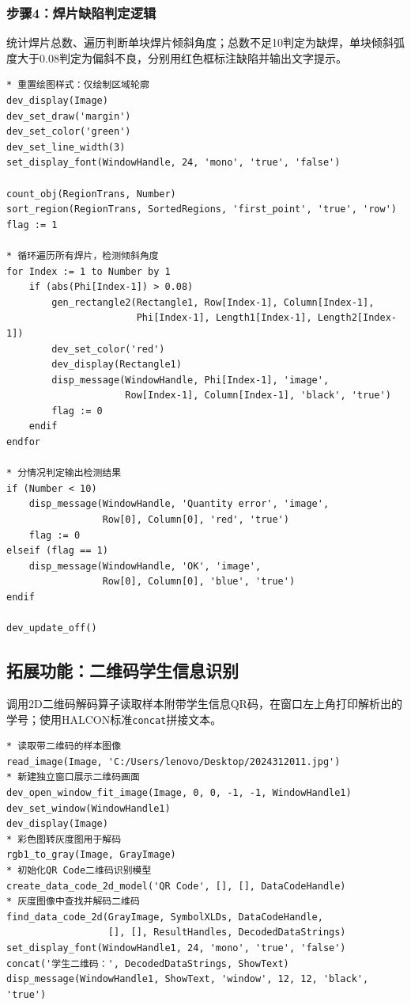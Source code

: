 \documentclass[UTF8,a4paper,12pt]{ctexart}
\begin{document}
\subsubsection{步骤4：焊片缺陷判定逻辑}
统计焊片总数、遍历判断单块焊片倾斜角度；总数不足10判定为缺焊，单块倾斜弧度大于0.08判定为偏斜不良，分别用红色框标注缺陷并输出文字提示。
\begin{lstlisting}[style=halconstyle, caption={焊片数量、倾斜缺陷判定完整逻辑}]
* 重置绘图样式：仅绘制区域轮廓
dev_display(Image)
dev_set_draw('margin')
dev_set_color('green')
dev_set_line_width(3)
set_display_font(WindowHandle, 24, 'mono', 'true', 'false')

count_obj(RegionTrans, Number)
sort_region(RegionTrans, SortedRegions, 'first_point', 'true', 'row')
flag := 1

* 循环遍历所有焊片，检测倾斜角度
for Index := 1 to Number by 1
    if (abs(Phi[Index-1]) > 0.08)
        gen_rectangle2(Rectangle1, Row[Index-1], Column[Index-1],
                       Phi[Index-1], Length1[Index-1], Length2[Index-1])
        dev_set_color('red')
        dev_display(Rectangle1)
        disp_message(WindowHandle, Phi[Index-1], 'image',
                     Row[Index-1], Column[Index-1], 'black', 'true')
        flag := 0
    endif
endfor

* 分情况判定输出检测结果
if (Number < 10)
    disp_message(WindowHandle, 'Quantity error', 'image',
                 Row[0], Column[0], 'red', 'true')
    flag := 0
elseif (flag == 1)
    disp_message(WindowHandle, 'OK', 'image',
                 Row[0], Column[0], 'blue', 'true')
endif

dev_update_off()
\end{lstlisting}

\subsection{拓展功能：二维码学生信息识别}
调用2D二维码解码算子读取样本附带学生信息QR码，在窗口左上角打印解析出的学号；使用HALCON标准\texttt{concat}拼接文本。
\begin{lstlisting}[style=halconstyle, caption={QR二维码识别与学号显示}]
* 读取带二维码的样本图像
read_image(Image, 'C:/Users/lenovo/Desktop/2024312011.jpg')
* 新建独立窗口展示二维码画面
dev_open_window_fit_image(Image, 0, 0, -1, -1, WindowHandle1)
dev_set_window(WindowHandle1)
dev_display(Image)
* 彩色图转灰度图用于解码
rgb1_to_gray(Image, GrayImage)
* 初始化QR Code二维码识别模型
create_data_code_2d_model('QR Code', [], [], DataCodeHandle)
* 灰度图像中查找并解码二维码
find_data_code_2d(GrayImage, SymbolXLDs, DataCodeHandle,
                  [], [], ResultHandles, DecodedDataStrings)
set_display_font(WindowHandle1, 24, 'mono', 'true', 'false')
concat('学生二维码：', DecodedDataStrings, ShowText)
disp_message(WindowHandle1, ShowText, 'window', 12, 12, 'black', 'true')
\end{lstlisting}
\end{document}
